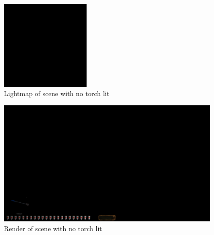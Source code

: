 \begin{appendix}
\begin{figure}[htbp]
	\centering
		\includegraphics[width=0.40\textwidth]{img/PIX/none.png}
	\caption[Lightmap of scene with no torch lit]{Lightmap of scene with no torch lit}
	\label{fig:LightmapNone}
\end{figure}
\begin{figure}[htbp]
	\centering
		\includegraphics[width=1.00\textwidth]{img/PIX/render_none.png}
	\caption[Render of scene with no torch lit]{Render of scene with no torch lit}
	\label{fig:RenderNone}
\end{figure}


\end{appendix} 


\mbox{}
\newpage





%





 